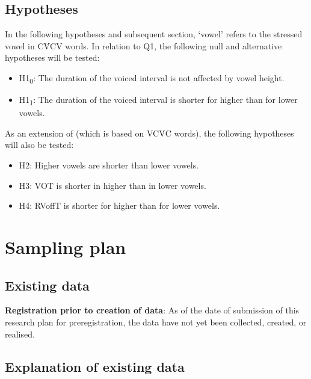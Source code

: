 \documentclass[11pt,]{article}
\providecommand{\tightlist}{%
  \setlength{\itemsep}{0pt}\setlength{\parskip}{0pt}}
\begin{document}
\hypertarget{hypotheses}{%
\subsection{Hypotheses}\label{hypotheses}}

In the following hypotheses and subsequent section, `vowel' refers to
the stressed vowel in CV́CV words. In relation to Q1, the following null
and alternative hypotheses will be tested:

\begin{itemize}
\tightlist
\item
  H1\textsubscript{0}: The duration of the voiced interval is not
  affected by vowel height.
\item
  H1\textsubscript{1}: The duration of the voiced interval is shorter
  for higher than for lower vowels.
\end{itemize}

As an extension of \citet{esposito2002} (which is based on VCV́C words),
the following hypotheses will also be tested:

\begin{itemize}
\tightlist
\item
  H2: Higher vowels are shorter than lower vowels.
\item
  H3: VOT is shorter in higher than in lower vowels.
\item
  H4: RVoffT is shorter for higher than for lower vowels.
\end{itemize}

\hypertarget{sampling-plan}{%
\section{Sampling plan}\label{sampling-plan}}

\hypertarget{existing-data}{%
\subsection{Existing data}\label{existing-data}}

\textbf{Registration prior to creation of data}: As of the date of
submission of this research plan for preregistration, the data have not
yet been collected, created, or realised.

\hypertarget{explanation-of-existing-data}{%
\subsection{Explanation of existing
data}\label{explanation-of-existing-data}}
\end{document}
